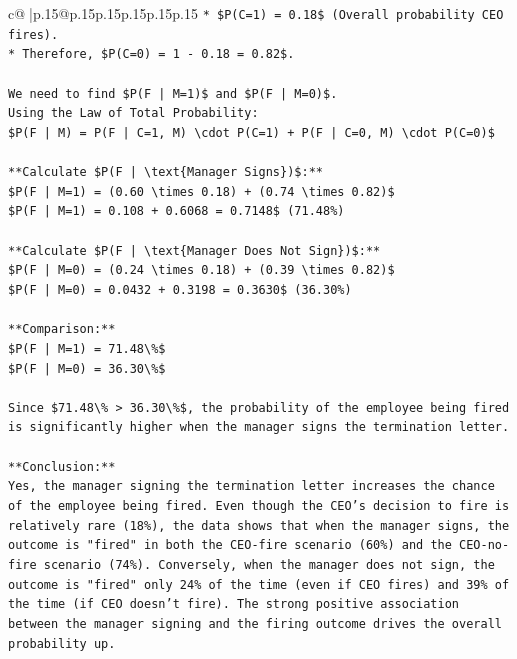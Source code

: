 \documentclass{article}
\begin{document}
{\begin{supertabular}{c@{$\;$}|p{.15\linewidth}@{}p{.15\linewidth}p{.15\linewidth}p{.15\linewidth}p{.15\linewidth}p{.15\linewidth}}
{{{\texttt{*   \$P(C=1) = 0.18\$ (Overall probability CEO fires).} \\
\texttt{*   Therefore, \$P(C=0) = 1 {-} 0.18 = 0.82\$.} \\
\\ 
\texttt{We need to find \$P(F | M=1)\$ and \$P(F | M=0)\$.} \\
\texttt{Using the Law of Total Probability:} \\
\texttt{\$P(F | M) = P(F | C=1, M) \textbackslash{}cdot P(C=1) + P(F | C=0, M) \textbackslash{}cdot P(C=0)\$} \\
\\ 
\texttt{**Calculate \$P(F | \textbackslash{}text\{Manager Signs\})\$:**} \\
\texttt{\$P(F | M=1) = (0.60 \textbackslash{}times 0.18) + (0.74 \textbackslash{}times 0.82)\$} \\
\texttt{\$P(F | M=1) = 0.108 + 0.6068 = 0.7148\$ (71.48\%)} \\
\\ 
\texttt{**Calculate \$P(F | \textbackslash{}text\{Manager Does Not Sign\})\$:**} \\
\texttt{\$P(F | M=0) = (0.24 \textbackslash{}times 0.18) + (0.39 \textbackslash{}times 0.82)\$} \\
\texttt{\$P(F | M=0) = 0.0432 + 0.3198 = 0.3630\$ (36.30\%)} \\
\\ 
\texttt{**Comparison:**} \\
\texttt{\$P(F | M=1) = 71.48\textbackslash{}\%\$} \\
\texttt{\$P(F | M=0) = 36.30\textbackslash{}\%\$} \\
\\ 
\texttt{Since \$71.48\textbackslash{}\% > 36.30\textbackslash{}\%\$, the probability of the employee being fired is significantly higher when the manager signs the termination letter.} \\
\\ 
\texttt{**Conclusion:**} \\
\texttt{Yes, the manager signing the termination letter increases the chance of the employee being fired. Even though the CEO's decision to fire is relatively rare (18\%), the data shows that when the manager signs, the outcome is "fired" in both the CEO{-}fire scenario (60\%) and the CEO{-}no{-}fire scenario (74\%). Conversely, when the manager does not sign, the outcome is "fired" only 24\% of the time (even if CEO fires) and 39\% of the time (if CEO doesn't fire). The strong positive association between the manager signing and the firing outcome drives the overall probability up.} \\
}}}
\end{supertabular}}
\end{document}
